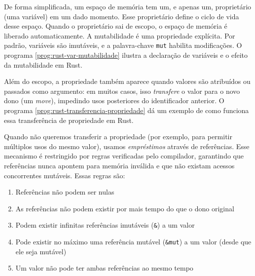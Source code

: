 De forma simplificada, um espaço de memória tem um, e apenas um, proprietário (uma variável) em um dado momento. Esse proprietário define o ciclo de vida desse espaço. Quando o proprietário sai de escopo, o espaço de memória é liberado automaticamente. A mutabilidade é uma propriedade explícita. Por padrão, variáveis são imutáveis, e a palavra-chave \texttt{mut} habilita modificações. O programa \ref{prog:rust-var-mutabilidade} ilustra a declaração de variáveis e o efeito da mutabilidade em Rust.

\begin{program}
  
  \caption{Declaração de variáveis e mutabilidade.\label{prog:rust-var-mutabilidade}}
\end{program}

Além do escopo, a propriedade também aparece quando valores são atribuídos ou passados como argumento: em muitos casos, isso \emph{transfere} o valor para o novo dono (um \emph{move}), impedindo usos posteriores do identificador anterior. O programa \ref{prog:rust-transferencia-propriedade} dá um exemplo de como funciona essa transferência de propriedade em Rust.

\begin{program}
  
  \caption{Transferência de propriedade.\label{prog:rust-transferencia-propriedade}}
\end{program}

Quando não queremos transferir a propriedade (por exemplo, para permitir múltiplos usos do mesmo valor), usamos \emph{empréstimos} através de referências. Esse mecanismo é restringido por regras verificadas pelo compilador, garantindo que referências nunca apontem para memória inválida e que não existam acessos concorrentes mutáveis. Essas regras são:

\begin{enumerate}
    \item Referências não podem ser nulas
    \item As referências não podem existir por mais tempo do que o dono original
    \item Podem existir infinitas referências imutáveis (\texttt{\&}) a um valor
    \item Pode existir no máximo uma referência mutável (\texttt{\&mut}) a um valor (desde que ele seja mutável)
    \item Um valor não pode ter ambas referências ao mesmo tempo
\end{enumerate}

